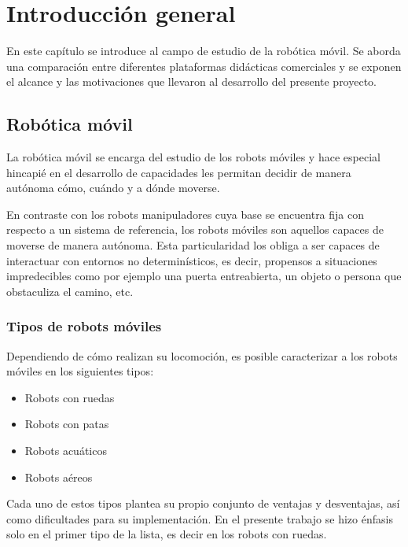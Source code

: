 \chapter{Introducción general}

\label{Capitulo1}

\newcommand{\keyword}[1]{\textbf{#1}}
\newcommand{\tabhead}[1]{\textbf{#1}}
\newcommand{\code}[1]{\texttt{#1}}
\newcommand{\file}[1]{\texttt{\bfseries#1}}
\newcommand{\option}[1]{\texttt{\itshape#1}}
\newcommand{\grados}{$^{\circ}$}

En este capítulo se introduce al campo de estudio de la robótica móvil. Se aborda una comparación entre diferentes plataformas didácticas comerciales y se exponen el alcance y las motivaciones que llevaron al desarrollo del presente proyecto.

\section{Robótica móvil}

La robótica móvil se encarga del estudio de los robots móviles y hace especial hincapié en el desarrollo de capacidades les permitan decidir de manera autónoma cómo, cuándo y a dónde moverse.

En contraste con los robots manipuladores cuya base se encuentra fija con respecto a un sistema de referencia, los robots móviles son aquellos capaces de moverse de manera autónoma. Esta particularidad los obliga a ser capaces de interactuar con entornos no determinísticos, es decir, propensos a situaciones impredecibles como por ejemplo una puerta entreabierta, un objeto o persona que obstaculiza el camino, etc.

\subsection{Tipos de robots móviles}

Dependiendo de cómo realizan su locomoción, es posible caracterizar a los robots móviles en los siguientes tipos:
\begin{itemize}
	\item{Robots con ruedas}
	\item{Robots con patas}
	\item{Robots acuáticos}
	\item{Robots aéreos}
\end{itemize}

Cada uno de estos tipos plantea su propio conjunto de ventajas y desventajas, así como dificultades para su implementación. En el presente trabajo se hizo énfasis solo en el primer tipo de la lista, es decir en los robots con ruedas.

